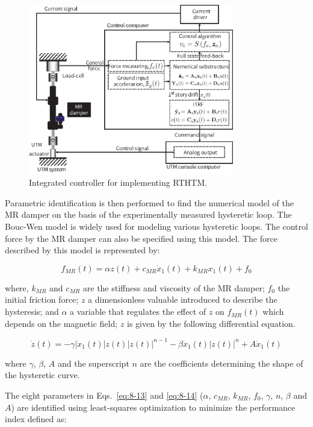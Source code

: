 \begin{figure}[H]
\centering
\includegraphics[width=0.8\textwidth] {figure/8-7.eps}
\caption{Integrated controller for implementing RTHTM.}
\label{fig:8-7}
\end{figure}

Parametric identification is then performed to find the numerical model of the MR damper on the basis of the experimentally measured hysteretic loop. The Bouc-Wen model is widely used for modeling various hysteretic loops\citep{wen1976method}. The control force by the MR damper can also be specified using this model. The force described by this model is represented by:

\begin{equation}\label{eq:8-13}
f_{MR}(t) = \alpha z(t) + c_{MR}\dot{x}_{1}(t) + k_{MR}x_{1}(t) + f_{0}
\end{equation}

where, $k_{MR}$ and $c_{MR}$ are the stiffness and viscosity of the MR damper; $f_{0}$ the initial friction force; $z$ a dimensionless valuable introduced to describe the hysteresis; and $\alpha$ a variable that regulates the effect of $z$ on $f_{MR}(t)$ which depends on the magnetic field; $z$ is given by the following differential equation.

\begin{equation}\label{eq:8-14}
\dot{z}(t) = -\gamma |\dot{x}_{1}(t)| z(t) |z(t)|^{n-1}-\beta\dot{x}_{1}(t)|z(t)|^{n}+A\dot{x}_{1}(t)
\end{equation}

where $\gamma$, $\beta$, $A$ and the superscript $n$ are the coefficients determining the shape of the hysteretic curve.

The eight parameters in Eqs.~\eqref{eq:8-13} and \eqref{eq:8-14} ($\alpha$, $c_{MR}$, $k_{MR}$, $f_{0}$, $\gamma$, $n$, $\beta$ and $A$) are identified using
least-squares optimization to minimize the performance index defined as:


